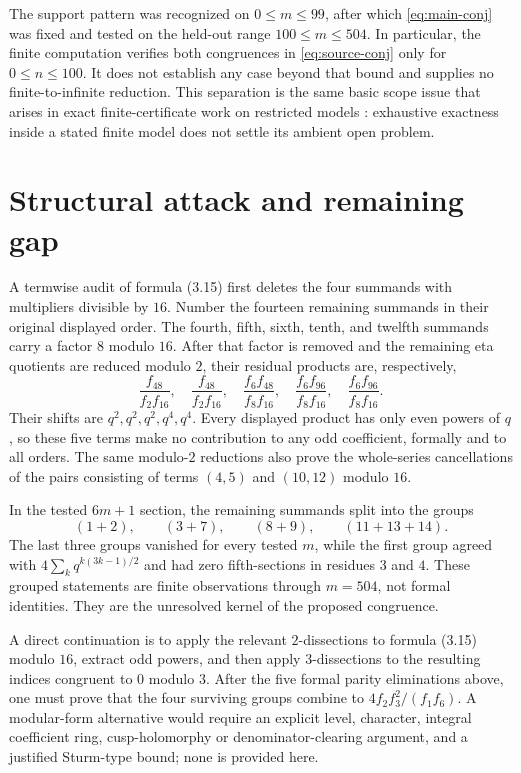\documentclass[11pt]{article}
\begin{document}
The support pattern was recognized on $0\leq m\leq99$, after which
\eqref{eq:main-conj} was fixed and tested on the held-out range
$100\leq m\leq504$.  In particular, the finite computation verifies both
congruences in \eqref{eq:source-conj} only for $0\leq n\leq100$.  It does
not establish any case beyond that bound and supplies no finite-to-infinite
reduction.  This separation is the same basic scope issue that arises in
exact finite-certificate work on restricted models
\cite{ZengEtAl2026Finite}: exhaustive exactness inside a stated finite model
does not settle its ambient open problem.

\section{Structural attack and remaining gap}

A termwise audit of formula (3.15) \cite{DasNathSarma2026} first deletes
the four summands with multipliers divisible by $16$. Number the fourteen
remaining summands in their original displayed order. The
fourth, fifth, sixth, tenth, and twelfth summands carry a factor $8$ modulo
$16$.  After that factor is removed and the remaining eta quotients are
reduced modulo $2$, their residual products are, respectively,
\[
 \frac{f_{48}}{f_2f_{16}},\quad
 \frac{f_{48}}{f_2f_{16}},\quad
 \frac{f_6f_{48}}{f_8f_{16}},\quad
 \frac{f_6f_{96}}{f_8f_{16}},\quad
 \frac{f_6f_{96}}{f_8f_{16}}.
\]
Their shifts are $q^2,q^2,q^2,q^4,q^4$.  Every displayed product has only
even powers of $q$, so these five terms make no contribution to any odd
coefficient, formally and to all orders.  The same modulo-$2$ reductions
also prove the whole-series cancellations of the pairs consisting of terms
$(4,5)$ and $(10,12)$ modulo $16$.

In the tested $6m+1$ section, the remaining summands split into the groups
\[
 (1+2),\qquad(3+7),\qquad(8+9),\qquad(11+13+14).
\]
The last three groups vanished for every tested $m$, while the first group
agreed with $4\sum_kq^{k(3k-1)/2}$ and had zero fifth-sections in residues
$3$ and $4$.  These grouped statements are finite observations through
$m=504$, not formal identities.  They are the unresolved kernel of the
proposed congruence.

A direct continuation is to apply the relevant $2$-dissections to formula
(3.15) modulo $16$, extract odd powers, and then apply $3$-dissections to
the resulting indices congruent to $0$ modulo $3$.  After the five formal
parity eliminations above, one must prove that the four surviving groups
combine to $4f_2f_3^2/(f_1f_6)$.  A modular-form alternative would require
an explicit level, character, integral coefficient ring, cusp-holomorphy or
denominator-clearing argument, and a justified Sturm-type bound; none is
provided here.
\end{document}
